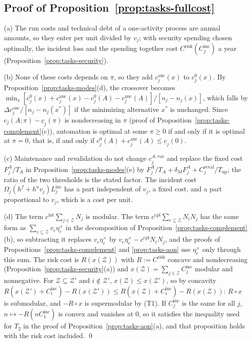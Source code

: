 \subsection*{Proof of Proposition~\ref{prop:tasks-fullcost}}

(a) The run costs and technical debt of a one-activity process are annual amounts, so they enter per unit divided by $v_j$; with security spending chosen optimally, the incident loss and the spending together cost $C^{\mathrm{risk}}(C^{\mathrm{inc}}_j)$ a year (Proposition~\ref{prop:tasks-security}).

(b) None of these costs depends on $\pi$, so they add $c^{\mathrm{anc}}_j(x)$ to $c^0_j(x)$. By Proposition~\ref{prop:tasks-modes}(d), the crossover becomes $\min_x[c^0_j(x)+c^{\mathrm{anc}}_j(x)-c^0_j(A)-c^{\mathrm{anc}}_j(A)]/[n_j-n_j(x)]$, which falls by $\Delta c^{\mathrm{anc}}_j/[n_j-n_j(x^*)]$ if the minimizing alternative $x^*$ is unchanged. Since $c_j(A;\pi)-\underline c_j(\pi)$ is nondecreasing in $\pi$ (proof of Proposition~\ref{prop:tasks-complement}(c)), automation is optimal at some $\pi\ge 0$ if and only if it is optimal at $\pi=0$, that is, if and only if $c^0_j(A)+c^{\mathrm{anc}}_j(A)\le\underline c_j(0)$.

(c) Maintenance and revalidation do not change $c^{A,\mathrm{var}}_j$ and replace the fixed cost $F^A_j/T_A$ in Proposition~\ref{prop:tasks-modes}(e) by $F^A_j/T_A+\delta_MF^A_j+C^{\mathrm{reval}}_j/T_{\mathrm{up}}$; the ratio of the two thresholds is the stated factor. The incident cost $\Omega_j(h^f+h^uv_j)L^{\mathrm{inc}}_j$ has a part independent of $v_j$, a fixed cost, and a part proportional to $v_j$, which is a cost per unit.

(d) The term $c^{\mathrm{int}}\sum_{j\in\mathcal Z}N_j$ is modular. The term $c^{\mathrm{cpl}}\sum_{e\subseteq\mathcal Z}N_iN_j$ has the same form as $\sum_{e\subseteq\mathcal Z}v_e\eta^\times_e$ in the decomposition of Proposition~\ref{prop:tasks-complement}(b), so subtracting it replaces $v_e\eta^\times_e$ by $v_e\eta^\times_e-c^{\mathrm{cpl}}N_iN_j$, and the proofs of Propositions~\ref{prop:tasks-complement} and \ref{prop:tasks-aon} use $\eta^\times_e$ only through this sum. The risk cost is $R(x(\mathcal Z))$ with $R:=C^{\mathrm{risk}}$ concave and nondecreasing (Proposition~\ref{prop:tasks-security}(a)) and $x(\mathcal Z)=\sum_{j\in\mathcal Z}C^{\mathrm{inc}}_j$ modular and nonnegative. For $\mathcal Z\subseteq\mathcal Z'$ and $i\notin\mathcal Z'$, $x(\mathcal Z)\le x(\mathcal Z')$, so by concavity $R(x(\mathcal Z')+C^{\mathrm{inc}}_i)-R(x(\mathcal Z'))\le R(x(\mathcal Z)+C^{\mathrm{inc}}_i)-R(x(\mathcal Z))$: $R\circ x$ is submodular, and $-R\circ x$ is supermodular by (T1). If $C^{\mathrm{inc}}_j$ is the same for all $j$, $n\mapsto-R(nC^{\mathrm{inc}}_1)$ is convex and vanishes at $0$, so it satisfies the inequality used for $T_2$ in the proof of Proposition~\ref{prop:tasks-aon}(a), and that proposition holds with the risk cost included. \qed

